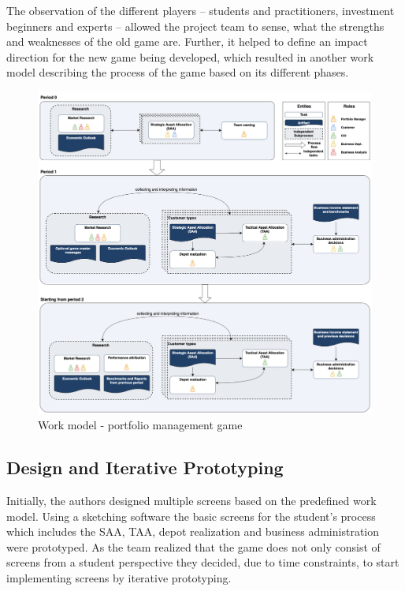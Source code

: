 The observation of the different players – students and practitioners, investment beginners and experts – allowed the project team to sense, what the strengths and weaknesses of the old game are. Further, it helped to define an impact direction for the new game being developed, which resulted in another work model describing the process of the game based on its different phases. %

\begin{figure}[h!]
  \centering
  \includegraphics[scale=0.25]{img/work_model_pfm_game.png}
  \caption{Work model - portfolio management game}
\end{figure}

\subsection{Design and Iterative Prototyping}
Initially, the authors designed multiple screens based on the predefined work model. Using a sketching software the basic screens for the student's process which includes the SAA, TAA, depot realization and business administration were prototyped. As the team realized that the game does not only consist of screens from a student perspective they decided, due to time constraints, to start implementing screens by iterative prototyping. \\

